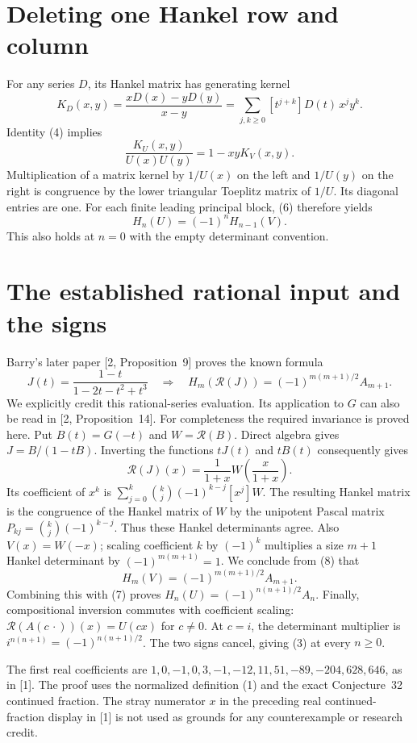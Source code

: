 \documentclass[11pt]{article}
\newcommand{\rev}{\mathcal R}
\begin{document}
\section*{Deleting one Hankel row and column}
For any series \(D\), its Hankel matrix has generating kernel
\[
 K_D(x,y)=\frac{xD(x)-yD(y)}{x-y}
         =\sum_{j,k\ge0}[t^{j+k}]D(t)\,x^jy^k.
\]
Identity (4) implies
\[
 \frac{K_U(x,y)}{U(x)U(y)}=1-xyK_V(x,y).             \tag{6}
\]
Multiplication of a matrix kernel by \(1/U(x)\) on the left
and \(1/U(y)\) on the right is congruence by the lower triangular
Toeplitz matrix of \(1/U\). Its diagonal entries are one.
For each finite leading principal block, (6) therefore yields
\[
                  H_n(U)=(-1)^n H_{n-1}(V).          \tag{7}
\]
This also holds at \(n=0\) with the empty determinant convention.

\section*{The established rational input and the signs}
Barry's later paper [2, Proposition~9] proves the known formula
\[
 J(t)=\frac{1-t}{1-2t-t^2+t^3}
 \quad\Longrightarrow\quad
 H_m(\rev(J))=(-1)^{m(m+1)/2}A_{m+1}.                \tag{8}
\]
We explicitly credit this rational-series evaluation. Its
application to \(G\) can also be read in [2, Proposition~14].
For completeness the required invariance is proved here.
Put \(B(t)=G(-t)\) and \(W=\rev(B)\). Direct algebra gives
\(J=B/(1-tB)\). Inverting the functions \(tJ(t)\) and
\(tB(t)\) consequently gives
\[
 \rev(J)(x)=\frac1{1+x}W\!\left(\frac{x}{1+x}\right). \tag{9}
\]
Its coefficient of \(x^k\) is
\(\sum_{j=0}^k\binom kj(-1)^{k-j}[x^j]W\).
The resulting Hankel matrix is the congruence of the Hankel
matrix of \(W\) by the unipotent Pascal matrix
\(P_{kj}=\binom kj(-1)^{k-j}\).
Thus these Hankel determinants agree. Also \(V(x)=W(-x)\);
scaling coefficient \(k\) by \((-1)^k\) multiplies a size
\(m+1\) Hankel determinant by \((-1)^{m(m+1)}=1\).
We conclude from (8) that
\[
 H_m(V)=(-1)^{m(m+1)/2}A_{m+1}.
\]
Combining this with (7) proves
\(H_n(U)=(-1)^{n(n+1)/2}A_n\).
Finally, compositional inversion commutes with coefficient
scaling: \(\rev(A(c\,\cdot))(x)=U(cx)\) for \(c\ne0\).
At \(c=i\), the determinant multiplier is
\(i^{n(n+1)}=(-1)^{n(n+1)/2}\). The two signs cancel,
giving (3) at every \(n\ge0\).

The first real coefficients are
\(1,0,-1,0,3,-1,-12,11,51,-89,-204,628,646\), as in [1].
The proof uses the normalized definition (1) and the exact
Conjecture~32 continued fraction. The stray numerator \(x\)
in the preceding real continued-fraction display in [1] is
not used as grounds for any counterexample or research credit.
\end{document}
